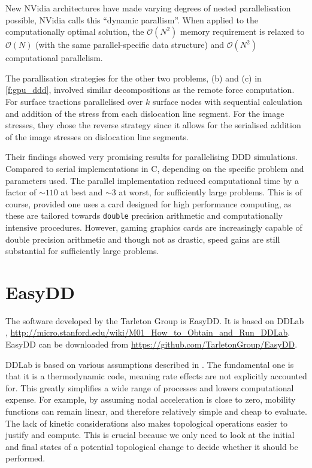 New NVidia architectures have made varying degrees of nested parallelisation possible, NVidia calls this ``dynamic parallism''. When applied to the computationally optimal solution, the $ \mathcal{O}(N^{2}) $ memory requirement is relaxed to $ \mathcal{O}(N) $ (with the same parallel-specific data structure) and $ \mathcal{O}(N^{2}) $ computational parallelism.

The parallisation strategies for the other two problems, (b) and (c) in \cref{f:gpu_ddd}, involved similar decompositions as the remote force computation. For surface tractions \citet{gpu_ddd} parallelised over $ k $ surface nodes with sequential calculation and addition of the stress from each dislocation line segment. For the image stresses, they chose the reverse strategy since it allows for the serialised addition of the image stresses on dislocation line segments.

Their findings showed very promising results for parallelising DDD simulations. Compared to serial implementations in C, depending on the specific problem and parameters used. The parallel implementation reduced computational time by a factor of $ \sim 110 $ at best and $ \sim 3 $ at worst, for sufficiently large problems. This is of course, provided one uses a card designed for high performance computing, as these are tailored towards \texttt{double} precision arithmetic and computationally intensive procedures. However, gaming graphics cards are increasingly capable of double precision arithmetic and though not as drastic, speed gains are still substantial for sufficiently large problems.

\section{EasyDD}
\label{s:EasyDDIntro}

The software developed by the Tarleton Group is EasyDD. It is based on DDLab \cite{ddlab}, \href{http://micro.stanford.edu/wiki/M01_How_to_Obtain_and_Run_DDLab}{http://micro.stanford.edu/wiki/M01\_How\_to\_Obtain\_and\_Run\_DDLab}. EasyDD can be downloaded from \href{https://github.com/TarletonGroup/EasyDD}{https://github.com/TarletonGroup/EasyDD}.

DDLab is based on various assumptions described in \cite{arsenlis2007enabling}. The fundamental one is that it is a thermodynamic code, meaning rate effects are not explicitly accounted for. This greatly simplifies a wide range of processes and lowers computational expense. For example, by assuming nodal acceleration is close to zero, mobility functions can remain linear, and therefore relatively simple and cheap to evaluate. The lack of kinetic considerations also makes topological operations easier to justify and compute. This is crucial because we only need to look at the initial and final states of a potential topological change to decide whether it should be performed.

